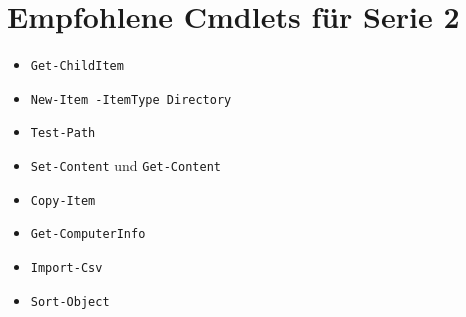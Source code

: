 \documentclass[11pt, oneside, numbers=noenddot]{scrbook}
\begin{document}
\section{Empfohlene Cmdlets für Serie 2}
\begin{itemize}
\item \texttt{Get-ChildItem}
\item \texttt{New-Item -ItemType Directory}
\item \texttt{Test-Path}
\item \texttt{Set-Content} und \texttt{Get-Content}
\item \texttt{Copy-Item}
\item \texttt{Get-ComputerInfo}
\item \texttt{Import-Csv}
\item \texttt{Sort-Object}
\end{itemize}
\end{document}
